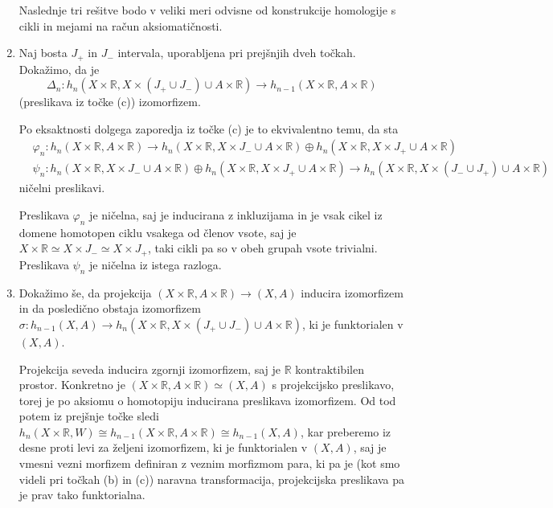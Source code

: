 \documentclass[a4paper, 12pt]{article}
\newcommand{\R}{\mathbb{R}}
\newcommand{\iso}{\cong}
\newcommand{\htpeq}{\simeq}
\begin{document}
\begin{enumerate}[label=(\alph*)]
	Naslednje tri rešitve bodo v veliki meri odvisne od konstrukcije homologije s cikli in mejami na račun aksiomatičnosti.
	\item Naj bosta $J_+$ in $J_-$ intervala, uporabljena pri prejšnjih dveh točkah. Dokažimo, da je
	\[
	\Delta_n\colon h_n(X \times \R, X \times (J_+ \cup J_-) \cup A \times \R) \to h_{n-1}(X \times \R, A \times \R)
	\]
	(preslikava iz točke (c)) izomorfizem.
	
	Po eksaktnosti dolgega zaporedja iz točke (c) je to ekvivalentno temu, da sta
	\begin{align*}
	&\varphi_n \colon h_n(X\times\R, A\times\R) \to h_n(X\times\R, X\times J_- \cup A\times\R)\oplus h_n(X\times\R, X\times J_+ \cup A\times\R)\\
	&\psi_n\colon h_n(X\times\R, X\times J_- \cup A\times\R)\oplus h_n(X\times\R, X\times J_+ \cup A\times\R) \to h_n(X\times\R, X\times (J_- \cup J_+) \cup A \times \R)
	\end{align*}
	ničelni preslikavi.
	
	Preslikava $\varphi_n$ je ničelna, saj je inducirana z inkluzijama in je vsak cikel iz domene homotopen ciklu vsakega od členov vsote, saj je $X\times \R \htpeq X \times J_- \htpeq X \times J_+$, taki cikli pa so v obeh grupah vsote trivialni. Preslikava $\psi_n$ je ničelna iz istega razloga.
	
	\item Dokažimo še, da projekcija $(X \times \R, A \times \R) \to (X, A)$ inducira izomorfizem in da posledično obstaja izomorfizem $\sigma\colon h_{n-1}(X, A) \to h_n(X\times\R, X\times (J_+ \cup J_-) \cup A \times \R)$, ki je funktorialen v $(X, A)$.
	
	Projekcija seveda inducira zgornji izomorfizem, saj je $\R$ kontraktibilen prostor. Konkretno je $(X \times \R, A \times \R) \htpeq (X, A)$ s projekcijsko preslikavo, torej je po aksiomu o homotopiju inducirana preslikava izomorfizem.
	Od tod potem iz prejšnje točke sledi $h_{n}(X\times\R, W) \iso h_{n-1}(X\times\R, A\times\R) \iso h_{n-1}(X, A)$, kar preberemo iz desne proti levi za željeni izomorfizem, ki je funktorialen v $(X, A)$, saj je vmesni vezni morfizem definiran z veznim morfizmom para, ki pa je (kot smo videli pri točkah (b) in (c)) naravna transformacija, projekcijska preslikava pa je prav tako funktorialna.
	

\end{enumerate}
\end{document}
